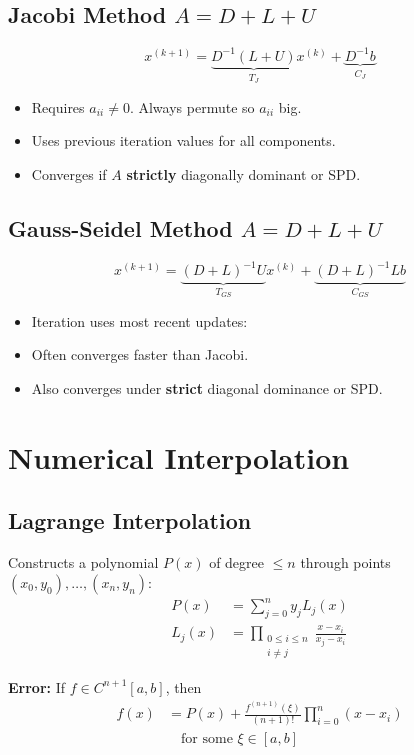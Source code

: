 \documentclass[8pt, letterpaper]{extarticle}
\begin{document}
\begin{multicols*}{3}
  \subsection{Jacobi Method $A = D + L + U$}
  \[
    x^{(k+1)} = \underbrace{D^{-1}(L+U)}_{T_J}x^{(k)} 
    + \underbrace{D^{-1}b}_{C_J}
  \]
  \begin{itemize}
    \item Requires $a_{ii} \ne 0$. Always permute so $a_{ii}$ big.
    \item Uses previous iteration values for all components.
    \item Converges if $A$ \textbf{strictly} diagonally dominant or SPD.
  \end{itemize}

  \subsection{Gauss-Seidel Method $A = D + L + U$}
  \[
    x^{(k+1)} = \underbrace{(D + L)^{-1}U}_{T_{GS}}x^{(k)} 
    + \underbrace{(D + L)^{-1}Lb}_{C_{GS}}
  \]
  \begin{itemize}
    \item Iteration uses most recent updates:
    \item Often converges faster than Jacobi.
    \item Also converges under \textbf{strict} diagonal dominance or SPD.
  \end{itemize}

  \section{Numerical Interpolation}

  \subsection{Lagrange Interpolation}
  Constructs a polynomial $P(x)$ of degree $\leq n$ through points $(x_0, y_0), \dots, (x_n, y_n)$:
  \begin{align*}
    P(x) &= \sum_{j=0}^n y_j L_j(x) \\
    L_j(x) &= \prod_{\substack{0 \le i \le n \\ i \ne j}} \frac{x - x_i}{x_j - x_i}
  \end{align*}
  
  \textbf{Error:} If $f \in C^{n+1}[a, b]$, then
  \begin{align*}
    f(x) &= P(x) + \frac{f^{(n+1)}(\xi)}{(n+1)!} \prod_{i=0}^n (x - x_i)\\ 
    &\quad \text{for some } \xi \in [a, b]
  \end{align*}
  

\end{multicols*}
\end{document}
